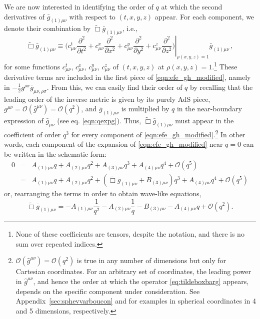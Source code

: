 \documentclass[a4paper,11pt]{article}
\numberwithin{equation}{section}
\begin{document}
We are now interested in identifying the order of $q$ at which the second derivatives of $ \bar{g}_{(1) \mu \nu}$ with respect to $(t,x,y,z)$ appear.
For each component, we denote their combination by $\tilde{\Box}\bar{g}_{(1)\mu\nu}$, i.e., 
\begin{equation}
\label{eq:tildeboxbarg}
\tilde{\Box}\bar{g}_{(1)\mu\nu}\equiv\left.\biggl(c^t_{\mu\nu}\frac{\partial^2}{\partial t^2}+c^x_{\mu\nu}\frac{\partial^2}{\partial x^2}+c^y_{\mu\nu}\frac{\partial^2}{\partial y^2}+c^z_{\mu\nu}\frac{\partial^2}{\partial z^2}\biggr)\right |_{\rho(x,y,z)=1}\bar{g}_{(1)\mu\nu}\,,
\end{equation}
for some functions $c^t_{\mu\nu}$, $c^x_{\mu\nu}$, $c^y_{\mu\nu}$, $c^z_{\mu\nu}$ of $(t,x,y,z)$ at $\rho(x,y,z)=1$.\footnote{None of these coefficients are tensors, despite the notation, and there is no sum over repeated indices.}
These derivative terms are included in the first piece of \eqref{eqn:efe_gh_modified}, namely in $-\frac{1}{2}g^{\rho \sigma} \bar{g}_{\mu \nu, \rho \sigma}$. From this, we can easily find their order of $q$ by recalling that the leading order of the inverse metric is given by its purely AdS piece, $g^{\mu\nu}=\mathcal{O}(\hat{g}^{\mu\nu})=\mathcal{O}(q^{2})$, and $\bar{g}_{(1)\mu\nu}$ is multiplied by $q$ in the near-boundary expression of $\bar{g}_{\mu\nu}$ (see eq. \eqref{eqn:qexpg}). Thus, $\tilde{\Box}\bar{g}_{(1)\mu\nu}$ must appear in the coefficient of order $q^{3}$ for every component of \eqref{eqn:efe_gh_modified}.\footnote{$\mathcal{O}(\hat{g}^{\mu\nu})=\mathcal{O}(q^{2})$ is true in any number of dimensions but only for Cartesian coordinates. For an arbitrary set of coordinates, the leading power in $\hat{g}^{\mu\nu}$, and hence the order at which the operator \eqref{eq:tildeboxbarg} appears, depends on the specific component under consideration.
See Appendix~\ref{sec:sphevvarboucon} and \cite{Bantilan:2012vu} for examples in spherical coordinates in 4 and 5 dimensions, respectively.}
In other words, each component of the expansion of \eqref{eqn:efe_gh_modified} near $q=0$ can be written in the schematic form:
\begin{eqnarray}\label{eq:efefullexp}
0 
&=& A_{(1)\mu\nu}q+A_{(2)\mu\nu}q^2+A_{(3)\mu\nu}q^3+A_{(4)\mu\nu}q^4+\mathcal{O}(q^5) \nonumber \\
&=& A_{(1)\mu\nu}q+A_{(2)\mu\nu}q^2+(\tilde{\Box}\bar{g}_{(1)\mu\nu}+B_{(3)\mu\nu})q^3+A_{(4)\mu\nu}q^4+\mathcal{O}(q^5)
\end{eqnarray}
or, rearranging the terms in order to obtain wave-like equations,
\begin{equation}
\label{eq:waveEFE}
\tilde{\Box}\bar{g}_{(1)\mu\nu}=-A_{(1)\mu\nu}\frac{1}{q^2}-A_{(2)\mu\nu}\frac{1}{q}-B_{(3)\mu\nu}-A_{(4)\mu\nu}q+\mathcal{O}(q^2).
\end{equation}
\end{document}
